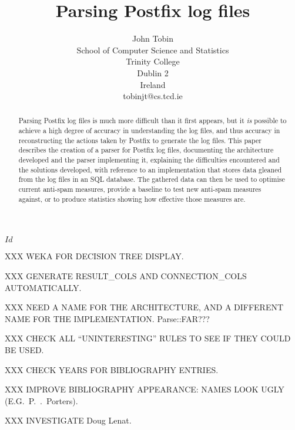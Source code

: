 \documentclass[a4paper,12pt,draft]{article}
\newcounter{dummy}
\begin{document}
\title{Parsing Postfix log files}
\author{John Tobin \\ School of Computer Science and Statistics \\
Trinity College \\ Dublin 2 \\ Ireland \\ tobinjt@cs.tcd.ie}
\maketitle
\SVN$Id$
\begin{center}\SVNId{}\end{center}

\begin{abstract}

    Parsing Postfix log files is much more difficult than it first appears,
    but it \textit{is\/} possible to achieve a high degree of accuracy in
    understanding the log files, and thus accuracy in reconstructing the
    actions taken by Postfix to generate the log files.  This paper
    describes the creation of a parser for Postfix log files, documenting
    the architecture developed and the parser implementing it, explaining
    the difficulties encountered and the solutions developed, with
    reference to an implementation that stores data gleaned from the log
    files in an SQL database.  The gathered data can then be used to
    optimise current anti-spam measures, provide a baseline to test new
    anti-spam measures against, or to produce statistics showing how
    effective those measures are.

\end{abstract}

XXX WEKA FOR DECISION TREE DISPLAY\@.

XXX GENERATE RESULT\_COLS AND CONNECTION\_COLS AUTOMATICALLY\@.

XXX NEED A NAME FOR THE ARCHITECTURE, AND A DIFFERENT NAME FOR THE
IMPLEMENTATION\@.  Parse::FAR\@???

XXX CHECK ALL ``UNINTERESTING'' RULES TO SEE IF THEY COULD BE USED\@.

XXX CHECK YEARS FOR BIBLIOGRAPHY ENTRIES\@.

XXX IMPROVE BIBLIOGRAPHY APPEARANCE\@: NAMES LOOK UGLY (E.G.\ P.\
\empty{}.\ Porters)\@.

XXX INVESTIGATE Doug Lenat.

\newpage
\tableofcontents
\listoffigures
\listoftables
\end{document}
